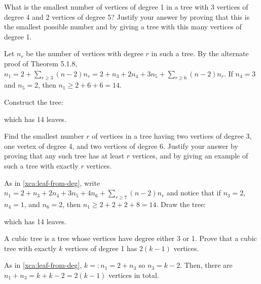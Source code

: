 \begin{xca}\label{xca:leaf-from-deg}
  What is the smallest number of vertices of degree 1 in a tree
  with 3 vertices of degree 4 and 2 vertices of degree 5?
  Justify your answer by proving that this is the smallest possible number
  and by giving a tree with this many vertices of degree 1.
\end{xca}
\begin{sol}
  Let $n_r$ be the number of vertices with degree $r$ in such a tree.
  By the alternate proof of Theorem 5.1.8,
  $n_1 = 2 + \sum_{r \geq 3}(n-2)n_r = 2 + n_3 + 2n_4 + 3n_5 + \sum_{r \geq 6}(n-2)n_r$.
  If $n_4 = 3$ and $n_5 = 2$, then $n_1 \geq 2 + 6 + 6 = 14$.

  Construct the tree:
  \begin{center}
  \end{center}
  which has 14 leaves.
\end{sol}

\begin{xca}
  Find the smallest number $r$ of vertices in a tree having
  two vertices of degree 3, one vertex of degree 4, and two vertices of degree 6.
  Justify your answer by proving that any such tree has at least $r$ vertices,
  and by giving an example of such a tree with exactly $r$ vertices.
\end{xca}
\begin{sol}
  As in \cref{xca:leaf-from-deg}, write $n_1 = 2 + n_3 + 2n_4 + 3n_5 + 4n_6 + \sum_{r \geq 7}(n-2)n_r$
  and notice that if $n_3 = 2$, $n_4 = 1$, and $n_6 = 2$,
  then $n_1 \geq 2 + 2 + 2 + 8 = 14$.
  Draw the tree:
  \begin{center}
  \end{center}
  which has 14 leaves.
\end{sol}

\begin{xca}
  A cubic tree is a tree whose vertices have degree either 3 or 1.
  Prove that a cubic tree with exactly $k$ vertices of degree 1
  has $2(k - 1)$ vertices.
\end{xca}
\begin{prf}
  As in \cref{xca:leaf-from-deg}, $k =: n_1 = 2 + n_3$ so $n_3 = k - 2$.
  Then, there are $n_1 + n_3 = k + k - 2 = 2(k-1)$ vertices in total.
\end{prf}

